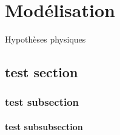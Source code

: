 \chapter{Modélisation}
\label{chaper-1}

Hypothèses physiques

\section{test section}
\subsection{test subsection}
\subsubsection{test subsubsection}
